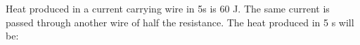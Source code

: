 Heat produced in a current carrying wire in 5s is 60 J. 
The same current is passed through another wire of
half the resistance. The heat produced in 5 s will be: